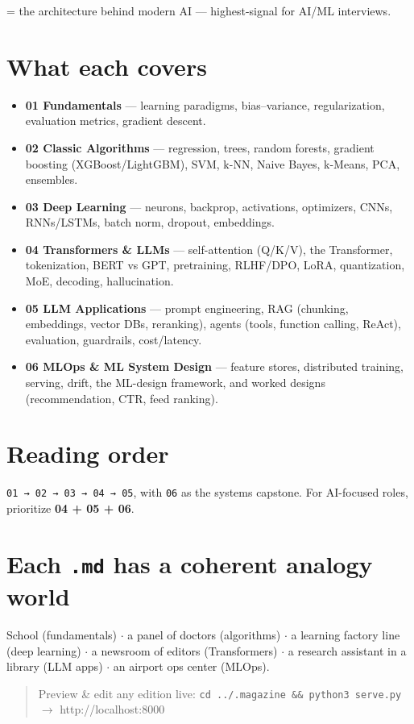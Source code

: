 \documentclass[11pt]{article}
\providecommand{\tightlist}{\setlength{\itemsep}{1pt}\setlength{\parskip}{0pt}}
\begin{document}
= the architecture behind modern AI --- highest-signal for AI/ML interviews.

\section{What each covers}\label{what-each-covers}

\begin{itemize}
\tightlist
\item
  \textbf{01 Fundamentals} --- learning paradigms, bias--variance, regularization, evaluation metrics, gradient descent.
\item
  \textbf{02 Classic Algorithms} --- regression, trees, random forests, gradient boosting (XGBoost/LightGBM), SVM, k-NN, Naive Bayes, k-Means, PCA, ensembles.
\item
  \textbf{03 Deep Learning} --- neurons, backprop, activations, optimizers, CNNs, RNNs/LSTMs, batch norm, dropout, embeddings.
\item
  \textbf{04 Transformers \& LLMs} --- self-attention (Q/K/V), the Transformer, tokenization, BERT vs GPT, pretraining, RLHF/DPO, LoRA, quantization, MoE, decoding, hallucination.
\item
  \textbf{05 LLM Applications} --- prompt engineering, RAG (chunking, embeddings, vector DBs, reranking), agents (tools, function calling, ReAct), evaluation, guardrails, cost/latency.
\item
  \textbf{06 MLOps \& ML System Design} --- feature stores, distributed training, serving, drift, the ML-design framework, and worked designs (recommendation, CTR, feed ranking).
\end{itemize}

\section{Reading order}\label{reading-order}

\texttt{01\ →\ 02\ →\ 03\ →\ 04\ →\ 05}, with \texttt{06} as the systems capstone. For AI-focused roles, prioritize \textbf{04 + 05 + 06}.

\section{\texorpdfstring{Each \texttt{.md} has a coherent analogy world}{Each .md has a coherent analogy world}}\label{each-md-has-a-coherent-analogy-world}

School (fundamentals) \(\cdot\) a panel of doctors (algorithms) \(\cdot\) a learning factory line (deep learning) \(\cdot\) a newsroom of editors (Transformers) \(\cdot\) a research assistant in a library (LLM apps) \(\cdot\) an airport ops center (MLOps).

\begin{quote}
Preview \& edit any edition live: \texttt{cd\ ../.magazine\ \&\&\ python3\ serve.py} \(\rightarrow\) http://localhost:8000
\end{quote}
\end{document}
